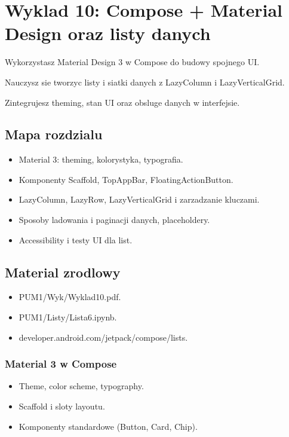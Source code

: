 \chapter{Wyklad 10: Compose + Material Design oraz listy danych}

\begin{learningobjectives}
  \item Wykorzystasz Material Design 3 w Compose do budowy spojnego UI.
  \item Nauczysz sie tworzyc listy i siatki danych z LazyColumn i LazyVerticalGrid.
  \item Zintegrujesz theming, stan UI oraz obsluge danych w interfejsie.
\end{learningobjectives}

\section{Mapa rozdzialu}
\begin{itemize}
  \item Material 3: theming, kolorystyka, typografia.
  \item Komponenty Scaffold, TopAppBar, FloatingActionButton.
  \item LazyColumn, LazyRow, LazyVerticalGrid i zarzadzanie kluczami.
  \item Sposoby ladowania i paginacji danych, placeholdery.
  \item Accessibility i testy UI dla list.
\end{itemize}

\section{Material zrodlowy}
\begin{itemize}
  \item PUM1/Wyk/Wyklad10.pdf.
  \item PUM1/Listy/Lista6.ipynb.
  \item developer.android.com/jetpack/compose/lists.
\end{itemize}

\subsection{Material 3 w Compose}
\begin{itemize}
  \item Theme, color scheme, typography.
  \item Scaffold i sloty layoutu.
  \item Komponenty standardowe (Button, Card, Chip).
\end{itemize}

